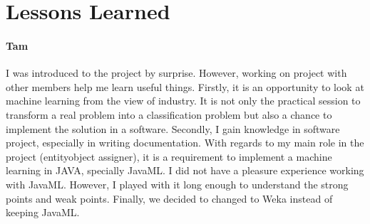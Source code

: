 \section{Lessons Learned}

\paragraph{Tam}
I was introduced to the project by surprise. However, working on \textan{} project
with other members help me learn useful things. Firstly, it is an opportunity to look at
machine learning from the view of industry. It is not only the practical session to transform a
real problem into a classification problem but also a chance to implement the solution in
a software. Secondly, I gain knowledge in software project, especially in writing documentation.
With regards to my main role in the project (entity\-object assigner), it is a requirement to
implement a machine learning in JAVA, specially JavaML. 
I did not have a pleasure experience working with JavaML. However, I played with it long enough to
understand the strong points and weak points. Finally, we decided to changed to Weka instead of keeping
JavaML.
 
